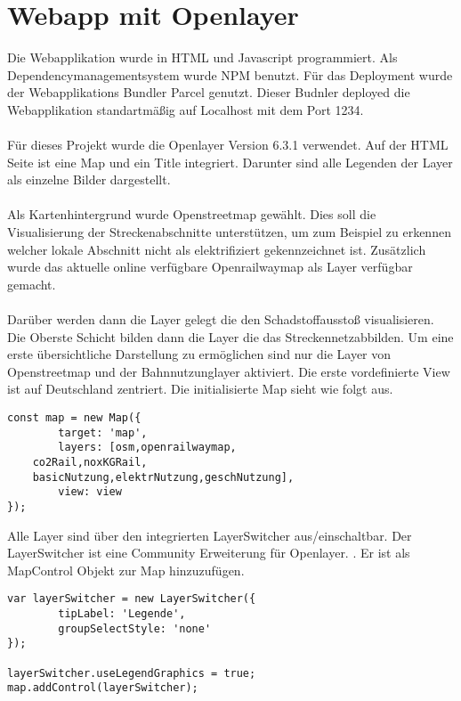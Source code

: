 \section{Webapp mit Openlayer}
Die Webapplikation wurde in HTML und Javascript programmiert. 
Als Dependencymanagementsystem wurde NPM benutzt.
Für das Deployment wurde der Webapplikations Bundler Parcel genutzt. Dieser Budnler deployed die Webapplikation standartmäßig auf Localhost mit dem Port 1234.
\\\\
Für dieses Projekt wurde die Openlayer Version 6.3.1 verwendet.
Auf der HTML Seite ist eine Map und ein Title integriert.
Darunter sind alle Legenden der Layer als einzelne Bilder dargestellt.
\\\\
Als Kartenhintergrund wurde Openstreetmap gewählt. Dies soll die Visualisierung der Streckenabschnitte unterstützen, um zum Beispiel zu erkennen welcher lokale Abschnitt nicht als elektrifiziert gekennzeichnet ist.
Zusätzlich wurde das aktuelle online verfügbare Openrailwaymap als Layer verfügbar gemacht.
\\\\
Darüber werden dann die Layer gelegt die den Schadstoffausstoß visualisieren.
Die Oberste Schicht bilden dann die Layer die das Streckennetzabbilden.
Um eine erste übersichtliche Darstellung zu ermöglichen sind nur die Layer von Openstreetmap und der Bahnnutzunglayer aktiviert.
Die erste vordefinierte View ist auf Deutschland zentriert.
Die initialisierte Map sieht wie folgt aus.
\begin{lstlisting}[frame=single,basicstyle=\small]
const map = new Map({
        target: 'map',
        layers: [osm,openrailwaymap,
	co2Rail,noxKGRail,
	basicNutzung,elektrNutzung,geschNutzung],
        view: view
});
\end{lstlisting}
Alle Layer sind über den integrierten LayerSwitcher aus/einschaltbar.
Der LayerSwitcher ist eine Community Erweiterung für Openlayer. \cite{layerswitcher}. Er ist als MapControl Objekt zur Map hinzuzufügen.
\begin{lstlisting}[frame=single,basicstyle=\small]
var layerSwitcher = new LayerSwitcher({
        tipLabel: 'Legende',
        groupSelectStyle: 'none' 
});

layerSwitcher.useLegendGraphics = true;
map.addControl(layerSwitcher);
\end{lstlisting}
